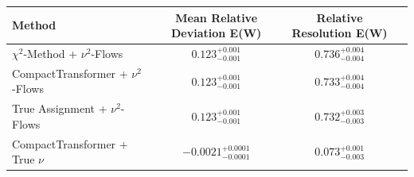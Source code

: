     \begin{tabular}{lccc}
        \toprule
        Method & Mean Relative Deviation E(W) & Relative Resolution E(W) \\
        \midrule
        $\chi^2$-Method + $\nu^2$-Flows & $0.123_{-0.001}^{+0.001}$ & $0.736_{-0.004}^{+0.004}$ \\
        CompactTransformer + $\nu^2$-Flows & $0.123_{-0.001}^{+0.001}$ & $0.733_{-0.004}^{+0.004}$ \\
        True Assignment + $\nu^2$-Flows & $0.123_{-0.001}^{+0.001}$ & $0.732_{-0.003}^{+0.003}$ \\
        CompactTransformer + True $\nu$ & $-0.0021_{-0.0001}^{+0.0001}$ & $0.073_{-0.003}^{+0.001}$ \\
        \bottomrule
    \end{tabular}
